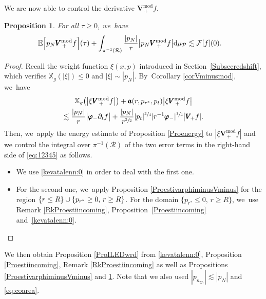 \documentclass[10pt]{amsart}
\theoremstyle{plain}
\newtheorem{proposition}{Proposition}[section]
\theoremstyle{definition}
\newcommand\T{{\mathbb{X}}}
\newcommand\dr{{\mathrm{d}}}
\begin{document}
We are now able to control the derivative $\pmb{V}_{\, +}^{ \mathrm{mod}} f$.

\begin{proposition}\label{ProestiVminusmod}
For all $\tau \geq 0$, we~have
\begin{align*}
& \mathbb{E} \Bigl[ p_N \pmb{V}_{\, +}^{ \mathrm{mod}} f \Bigr](\tau)+ \int_{\pi^{-1}(\mathcal{R}) } \frac{|p_N|}{r} \big| p_N \pmb{V}_{\, +}^{ \mathrm{mod}} f \big| \dr \mu_{\mathcal{P}} \lesssim \mathcal{F}[f](0).
\end{align*}
\end{proposition}
\begin{proof}
Recall the weight function $\xi(x,p)$ introduced in Section~\ref{Subsecredshift}, which verifies $\T_g(|\xi|) \leq 0$ and $|\xi| \sim |p_N|$. By~Corollary \ref{corVminusmod}, we~have\vspace*{-5pt}
\begin{multline}\label{eq:12345}
\T_g \bigl(\big| \xi \pmb{V}_{\, +}^{ \mathrm{mod}} f \big| \bigr) + \pmb{a}(r,p_{r^*},p_t) \big| \xi \pmb{V}_{\, +}^{ \mathrm{mod}} f \big| \\
\lesssim \frac{|p_N|}{r } \big| \pmb{\varphi}_- \partial_t f \big|+\frac{|p_N|}{r^{\sfrac{3}{2}}} |p_t|^{\sfrac{3}{4}}| r^{-1} \pmb{\varphi}_- |^{\sfrac{1}{4}} \big| \pmb{V}_{\! +} f|.
\end{multline}
Then, we~apply the energy estimate of Proposition \ref{Proenergy} to $| \xi \pmb{V}_{\, +}^{ \mathrm{mod}} f |$ and we control the integral over $\pi^{-1}(\mathcal{R})$ of the two error terms in the right-hand side of \eqref{eq:12345} as follows.
\begin{itemize}
\item We use \eqref{kevatalenn:0} in order to deal with the first one.
\item For the second one, we~apply Proposition \ref{ProestivarphiminusVminus} for the region $\{ r \leq R \} \cup \{ p_{r^*} \geq\nobreak 0, \, r \geq\nobreak R \}$. For the domain $\{p_{r^*} \leq 0, \, r \geq R \}$, we~use Remark \ref{RkProestiincoming}, Proposition~\ref{Proestiincoming} and~\eqref{kevatalenn:0}.\qedhere
\end{itemize}
\end{proof}

We then obtain Proposition \ref{ProILEDwrd} from \eqref{kevatalenn:0}, Proposition \ref{Proestiincoming}, Remark \ref{RkProestiincoming} as well as Propositions \ref{ProestivarphiminusVminus} and \ref{ProestiVminusmod}. Note that we also used $|p_{n_{\Sigma_\tau}}| \lesssim |p_N|$ and \eqref{eq:coarea}.
\end{document}

